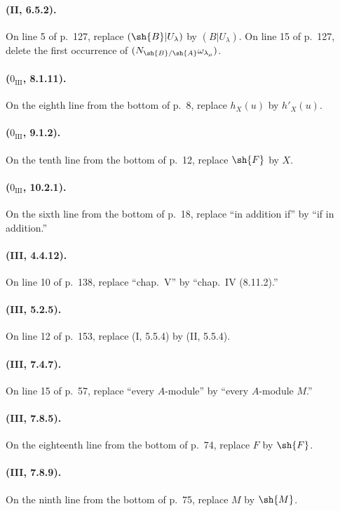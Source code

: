 \paragraph{(II, 6.5.2).}
On line 5 of p.~127, replace $(\sh{B}|U_\lambda)$ by $(B|U_\lambda)$.
On line 15 of p.~127, delete the first occurrence of
$(N_{\sh{B}/\sh{A}}\omega_{\lambda_\mu})$.

\paragraph{($0_{\mathrm{III}}$, 8.1.11).}
On the eighth line from the bottom of p.~8, replace $h_X(u)$ by
$h'_X(u)$.

\paragraph{($0_{\mathrm{III}}$, 9.1.2).}
On the tenth line from the bottom of p.~12, replace $\sh{F}$ by $X$.

\paragraph{($0_{\mathrm{III}}$, 10.2.1).}
On the sixth line from the bottom of p.~18, replace ``in addition if''
by ``if in addition.''

\paragraph{(III, 4.4.12).}
On line 10 of p.~138, replace ``chap.~V'' by ``chap.~IV (8.11.2).''

\paragraph{(III, 5.2.5).}
On line 12 of p.~153, replace (I, 5.5.4) by (II, 5.5.4).

\paragraph{(III, 7.4.7).}
On line 15 of p.~57, replace ``every $A$-module'' by
``every $A$-module $M$.''

\paragraph{(III, 7.8.5).}
On the eighteenth line from the bottom of p.~74, replace $F$ by $\sh{F}$.

\paragraph{(III, 7.8.9).}
On the ninth line from the bottom of p.~75, replace $M$ by $\sh{M}$.

